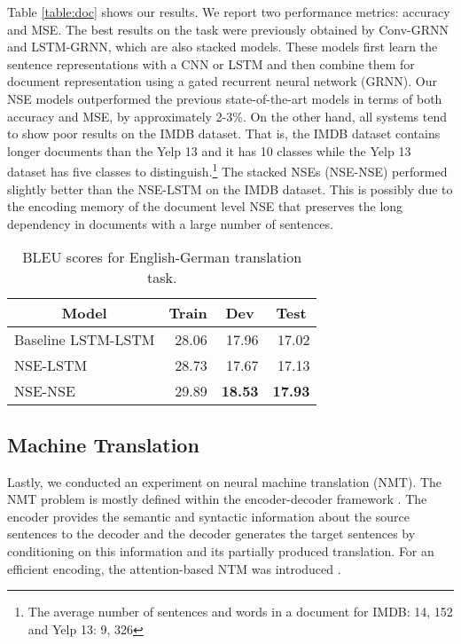 \documentclass{article}
\begin{document}
Table \ref{table:doc} shows our results. We report two performance metrics: accuracy and MSE. The best results on the task were previously obtained by Conv-GRNN and LSTM-GRNN, which are also stacked models. These models first learn the sentence representations with a CNN or LSTM and then combine them for document representation using a gated recurrent neural network (GRNN). Our NSE models outperformed the previous state-of-the-art models in terms of both accuracy and MSE, by approximately 2-3\%. On the other hand, all systems tend to show poor results on the IMDB dataset. That is, the IMDB dataset contains longer documents than the Yelp 13 and it has 10 classes while the Yelp 13 dataset has five classes to distinguish.\footnote{The average number of sentences and words in a document for IMDB: 14, 152 and Yelp 13: 9, 326} The stacked NSEs (NSE-NSE) performed slightly better than the NSE-LSTM on the IMDB dataset. This is possibly due to the encoding memory of the document level NSE that preserves the long dependency in documents with a large number of sentences.

\begin{table}[tp]
\begin{center}
\small
\begin{tabular}{c|c|c|c}
\hline 
Model & Train & Dev & Test \\
\hline
\multicolumn{1}{l|}{Baseline LSTM-LSTM} & \multicolumn{1}{|r|}{28.06} & \multicolumn{1}{|r|}{17.96} & \multicolumn{1}{|r}{17.02} \\
\multicolumn{1}{l|}{NSE-LSTM} & \multicolumn{1}{|r|}{28.73} & \multicolumn{1}{|r|}{17.67} & \multicolumn{1}{|r}{17.13} \\
\multicolumn{1}{l|}{NSE-NSE} & \multicolumn{1}{|r|}{29.89} & \multicolumn{1}{|r|}{\bf 18.53} & \multicolumn{1}{|r}{\bf 17.93} \\
\hline
\end{tabular}
\end{center}
\caption{\label{table:nmt}BLEU scores for English-German translation task.}
\end{table}


\subsection{Machine Translation}

Lastly, we conducted an experiment on neural machine translation (NMT). The NMT problem is mostly defined within the encoder-decoder framework \cite{kalchbrenner2013recurrent,cho2014learning,sutskever2014sequence}. 
The encoder provides the semantic and syntactic information about the source sentences to the decoder and the decoder generates the target sentences by conditioning on this information and its partially produced translation. 
For an efficient encoding, the attention-based NTM was introduced \cite{bahdanau:15}.
\end{document}
